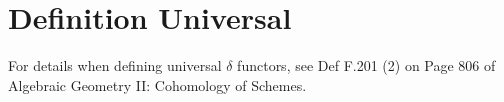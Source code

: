 \section{Definition Universal}

For details when defining universal $\delta$ functors, see Def F.201 (2) on Page 806 of Algebraic Geometry II: Cohomology of Schemes.
